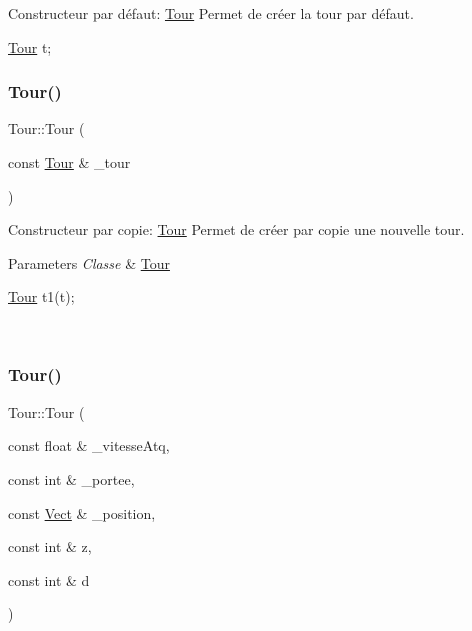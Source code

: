 Constructeur par défaut\+: \hyperlink{classTour}{Tour} Permet de créer la tour par défaut. 


\begin{DoxyCode}
\hyperlink{classTour}{Tour} t;
\end{DoxyCode}
 \mbox{\label{classTour_a3e25a64c74446192ac71283e08db4e49}} 
\subsubsection{\texorpdfstring{Tour()}{Tour()}\hspace{0.1cm}{\footnotesize\ttfamily [2/3]}}
{\footnotesize\ttfamily Tour\+::\+Tour (\begin{DoxyParamCaption}\item[{const \hyperlink{classTour}{Tour} \&}]{\+\_\+tour }\end{DoxyParamCaption})}



Constructeur par copie\+: \hyperlink{classTour}{Tour} Permet de créer par copie une nouvelle tour. 


\begin{DoxyParams}{Parameters}
{\em Classe} & \hyperlink{classTour}{Tour} 
\begin{DoxyCode}
\hyperlink{classTour}{Tour} t1(t);
\end{DoxyCode}
 \\
\hline
\end{DoxyParams}
\mbox{\label{classTour_abb21d80605aacb220f1ab7ac92119ce4}} 
\subsubsection{\texorpdfstring{Tour()}{Tour()}\hspace{0.1cm}{\footnotesize\ttfamily [3/3]}}
{\footnotesize\ttfamily Tour\+::\+Tour (\begin{DoxyParamCaption}\item[{const float \&}]{\+\_\+vitesse\+Atq,  }\item[{const int \&}]{\+\_\+portee,  }\item[{const \hyperlink{classVect}{Vect} \&}]{\+\_\+position,  }\item[{const int \&}]{z,  }\item[{const int \&}]{d }\end{DoxyParamCaption})}



